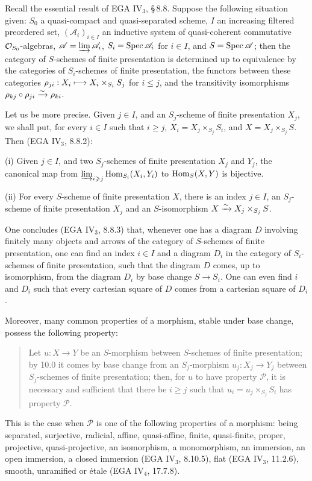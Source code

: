 \label{VIB.10.0}
Recall the essential result of EGA IV$_3$, \S\,8.8. Suppose the following situation given: $S_0$ a quasi-compact and quasi-separated scheme, $I$ an increasing filtered preordered set, $(\mathscr A_i)_{i\in I}$ an inductive system of quasi-coherent commutative $\mathcal{O}_{S_0}$-algebras, $\mathscr A=\varinjlim\mathscr A_i$, $S_i=\operatorname{Spec}\mathscr A_i$ for $i\in I$, and $S=\operatorname{Spec}\mathscr A$; then the category of $S$-schemes of finite presentation is determined up to equivalence by the categories of $S_i$-schemes of finite presentation, the functors between these categories $\rho_{ji}:X_i\longmapsto X_i\times_{S_i}S_j$ for $i\leq j$, and the transitivity isomorphisms $\rho_{kj}\circ\rho_{ji}\xrightarrow{\sim}\rho_{ki}$.

Let us be more precise. Given $j\in I$, and an $S_j$-scheme of finite presentation $X_j$, we shall put, for every $i\in I$ such that $i\geq j$, $X_i=X_j\times_{S_j}S_i$, and $X=X_j\times_{S_j}S$. Then (EGA IV$_3$, 8.8.2):

(i) Given $j\in I$, and two $S_j$-schemes of finite presentation $X_j$ and $Y_j$, the canonical map from $\varinjlim_{i\geqslant j}\operatorname{Hom}_{S_i}(X_i,Y_i)$ to $\operatorname{Hom}_S(X,Y)$ is bijective.

(ii) For every $S$-scheme of finite presentation $X$, there is an index $j\in I$, an $S_j$-scheme of finite presentation $X_j$ and an $S$-isomorphism $X\xrightarrow{\sim} X_j\times_{S_j}S$.

One concludes (EGA IV$_3$, 8.8.3) that, whenever one has a diagram $D$ involving finitely many objects and arrows of the category of $S$-schemes of finite presentation, one can find an index $i\in I$ and a diagram $D_i$ in the category of $S_i$-schemes of finite presentation, such that the diagram $D$ comes, up to isomorphism, from the diagram $D_i$ by base change $S\to S_i$. One can even find $i$ and $D_i$ such that every cartesian square of $D$ comes from a cartesian square of $D_i$.

\label{VIB.10.1}
Moreover, many common properties of a morphism, stable under base change, possess the following property:
\begin{quote}
Let $u:X\to Y$ be an $S$-morphism between $S$-schemes of finite presentation; by 10.0 it comes by base change from an $S_j$-morphism $u_j:X_j\to Y_j$ between $S_j$-schemes of finite presentation; then, for $u$ to have property $\mathscr P$, it is necessary and sufficient that there be $i\geq j$ such that $u_i=u_j\times_{S_j}S_i$ has property $\mathscr P$.
\end{quote}
This is the case when $\mathscr P$ is one of the following properties of a morphism: being separated, surjective, radicial, affine, quasi-affine, finite, quasi-finite, proper, projective, quasi-projective, an isomorphism, a monomorphism, an immersion, an open immersion, a closed immersion (EGA IV$_3$, 8.10.5), flat (EGA IV$_3$, 11.2.6), smooth, unramified or étale (EGA IV$_4$, 17.7.8).

